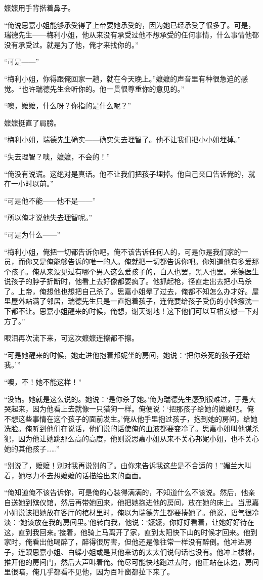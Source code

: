\par 嬷嬷用手背揩着鼻子。
\par “俺说思嘉小姐能够承受得了上帝要她承受的，因为她已经承受了很多了。可是，瑞德先生——梅利小姐，他从来没有承受过他不想承受的任何事情，什么事情他都没有承受过。就是为了他，俺才来找你的。”
\par “可是——”
\par “梅利小姐，你得跟俺回家一趟，就在今天晚上。”嬷嬷的声音里有种很急迫的感觉。“也许瑞德先生会听你的。他一贯很尊重你的意见的。”
\par “噢，嬷嬷，什么呀？你指的是什么呢？”
\par 嬷嬷挺直了肩膀。
\par “梅利小姐，瑞德先生确实——确实失去理智了。他不让我们把小小姐埋掉。”
\par “失去理智？噢，嬷嬷，不会的！”
\par “俺没有说谎。这绝对是真话。他不让我们把孩子埋掉。他自己亲口告诉俺的，就在一小时以前。”
\par “可是他不能——他不是——”
\par “所以俺才说他失去理智呢。”
\par “可是为什么——”
\par “梅利小姐，俺把一切都告诉你吧。俺不该告诉任何人的，可是你是我们家的一员，而你又是俺能够告诉的唯一的人。俺就把一切都告诉你吧。你知道他有多爱那个孩子。俺从来没见过有哪个男人这么爱孩子的，白人也罢，黑人也罢。米德医生说孩子的脖子折断时，他看上去好像都要疯了。他抓起枪，径直走出去把小马杀了。上帝，俺想他也想把自己杀了。思嘉小姐晕了过去，俺都不知怎么办才好。屋里屋外站满了邻居，瑞德先生只是一直抱着孩子，连俺要给孩子受伤的小脸擦洗一下都不让。思嘉小姐醒来的时候，俺想，谢天谢地！这下他们可以互相安慰一下对方了。”
\par 眼泪再次流下来，可这次嬷嬷连擦都不擦。
\par “可是她醒来的时候，她走进他抱着邦妮坐的房间，她说：‘把你杀死的孩子还给我。'”
\par “噢，不！她不能这样！”
\par “没错。她就是这么说的。她说：‘是你杀了她。’俺为瑞德先生感到很难过，于是大哭起来，因为他看上去就像一只猎狗一样。俺便说：‘把那孩子给她的嬷嬷吧。俺不想这些事情在这个孩子的面前发生。’俺从他手里抱过孩子，抱到她的房间，给她洗脸。俺听到他们在说话，他们说的话使俺的血液都要变冷了。思嘉小姐叫他谋杀犯，因为他让她跳那么高的高度，他则说思嘉小姐从来不关心邦妮小姐，也不关心她的其他孩子……”
\par “别说了，嬷嬷！别对我再说别的了。由你来告诉我这些是不合适的！”媚兰大叫着，她尽力不去想嬷嬷的话描绘出来的画面。
\par “俺知道俺不该告诉你，可是俺的心装得满满的，不知道什么不该说。然后，他亲自送她到殡仪馆，然后再带她回来，他把她抱进他的房间，放在她的床上。当思嘉小姐说该把她放在客厅的棺材里时，俺以为瑞德先生都要揍她了。他说，语气很冷淡：‘她该放在我的房间里。’他转向我，他说：‘嬷嬷，你好好看着，让她好好待在这，直到我回来。’接着，他骑上马离开了家，直到太阳快下山的时候才回来。他到家时，俺看出他喝醉了，醉得很厉害，但他还是像往常一样没有醉倒。他冲进房子，连跟思嘉小姐、白蝶小姐或是其他来访的太太们说句话也没有。他冲上楼梯，推开他的房间门，然后大声叫着俺。俺尽可能快地跑过去时，他正站在床边，房间里很暗，俺几乎都看不见他，因为百叶窗都拉下来了。
